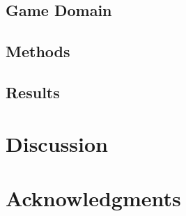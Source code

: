 \documentclass[letterpaper]{article}
\begin{document}
\subsection{Game Domain}


\subsection{Methods}


\subsection{Results}

\section{Discussion}




\section{Acknowledgments}



\end{document}
